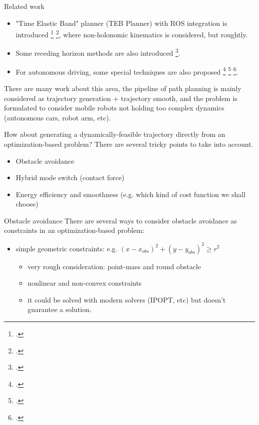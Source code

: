 \documentclass{beamer}
\begin{document}
\begin{frame}{Related work}
	\begin{itemize}
		\item "Time Elastic Band" planner (TEB Planner) with ROS integration is introduced \footcite{rosmann2012trajectory} \footcite{rosmann2013efficient}, where non-holonomic kinematics is considered, but roughtly.
		\item Some receding horizon methods are also introduced \footcite{kogan2006optimization}.
		\item For autonomous driving, some special techniques are also proposed \footcite{dolgov2010path} \footcite{ziegler2014trajectory} \footcite{gu2012road}.
	\end{itemize}
\end{frame}

\begin{frame}
	There are many work about this area, the pipeline of path planning is mainly considered as trajectory generation + trajectory smooth, and the problem is formulated to consider mobile robots not holding too complex dynamics (autonomous cars, robot arm, etc).
	
	\vspace{\baselineskip}
	How about generating a dynamically-feasible trajectory directly from an optimization-based problem? There are several tricky points to take into account.
	\begin{itemize}
		\item Obstacle avoidance
		\item Hybrid mode switch (contact force)
		\item Energy efficiency and smoothness (e.g. which kind of cost function we shall choose)
	\end{itemize}
\end{frame}

\begin{frame}{Obstacle avoidance}
	There are several ways to consider obstacle avoidance as constraints in an optimization-based problem:
	\begin{itemize}
		\item simple geometric constraints: e.g. $(x - x_{obs})^2 + (y - y_{obs})^2 \geq r^2 $
		\begin{itemize}
			\item very rough consideration: point-mass and round obstacle
			\item nonlinear and non-convex constraints
			\item it could be solved with modern solvers (IPOPT, etc) but doesn't guarantee a solution. 
		\end{itemize}
	\end{itemize}
\end{frame}
\end{document}
